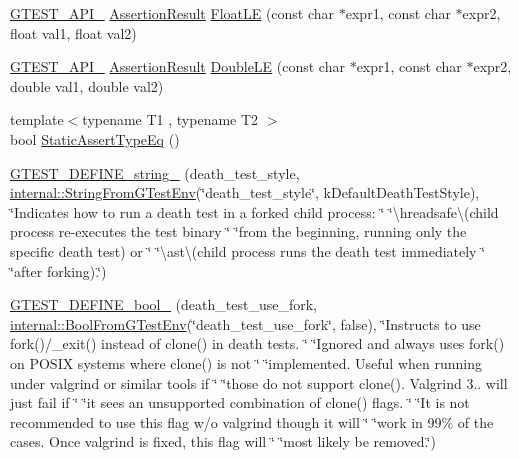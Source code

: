 \begin{DoxyCompactItemize}
\item 
\hyperlink{gtest-port_8h_aa73be6f0ba4a7456180a94904ce17790}{G\+T\+E\+S\+T\+\_\+\+A\+P\+I\+\_\+} \hyperlink{classtesting_1_1_assertion_result}{Assertion\+Result} \hyperlink{namespacetesting_a2c9a2a391c72a7b02ea3024586e33af0}{Float\+LE} (const char $\ast$expr1, const char $\ast$expr2, float val1, float val2)
\item 
\hyperlink{gtest-port_8h_aa73be6f0ba4a7456180a94904ce17790}{G\+T\+E\+S\+T\+\_\+\+A\+P\+I\+\_\+} \hyperlink{classtesting_1_1_assertion_result}{Assertion\+Result} \hyperlink{namespacetesting_ae10e2bb304b74abd1b06a2d912a8b43b}{Double\+LE} (const char $\ast$expr1, const char $\ast$expr2, double val1, double val2)
\item 
{\footnotesize template$<$typename T1 , typename T2 $>$ }\\bool \hyperlink{namespacetesting_a661e70fc6afeb5c085eed3716aa45059}{Static\+Assert\+Type\+Eq} ()
\item 
\hyperlink{namespacetesting_a8e954ed3f0f6ca2e90b043e419c74123}{G\+T\+E\+S\+T\+\_\+\+D\+E\+F\+I\+N\+E\+\_\+string\+\_\+} (death\+\_\+test\+\_\+style, \hyperlink{namespacetesting_1_1internal_ac54dabc540bf79c2de91add679bfb93b}{internal\+::\+String\+From\+G\+Test\+Env}(\char`\"{}death\+\_\+test\+\_\+style\char`\"{}, k\+Default\+Death\+Test\+Style), \char`\"{}Indicates how to run a death test in a forked child process\+: \char`\"{} \char`\"{}\textbackslash{}hreadsafe\textbackslash{}(child process re-\/executes the test binary \char`\"{} \char`\"{}from the beginning, running only the specific death test) or \char`\"{} \char`\"{}\textbackslash{}ast\textbackslash{}(child process runs the death test immediately \char`\"{} \char`\"{}after forking).\char`\"{})
\item 
\hyperlink{namespacetesting_a428e5944490e497df683cb8324ce4489}{G\+T\+E\+S\+T\+\_\+\+D\+E\+F\+I\+N\+E\+\_\+bool\+\_\+} (death\+\_\+test\+\_\+use\+\_\+fork, \hyperlink{namespacetesting_1_1internal_a67132cdce23fb71b6c38ee34ef81eb4c}{internal\+::\+Bool\+From\+G\+Test\+Env}(\char`\"{}death\+\_\+test\+\_\+use\+\_\+fork\char`\"{}, false), \char`\"{}Instructs to use fork()/\+\_\+exit() instead of clone() in death tests. \char`\"{} \char`\"{}Ignored and always uses fork() on P\+O\+S\+IX systems where clone() is not \char`\"{} \char`\"{}implemented. Useful when running under valgrind or similar tools if \char`\"{} \char`\"{}those do not support clone(). Valgrind 3.. will just fail if \char`\"{} \char`\"{}it sees an unsupported combination of clone() flags. \char`\"{} \char`\"{}It is not recommended to use this flag w/o valgrind though it will \char`\"{} \char`\"{}work in 99\% of the cases. Once valgrind is fixed, this flag will \char`\"{} \char`\"{}most likely be removed.\char`\"{})

\end{DoxyCompactItemize}
